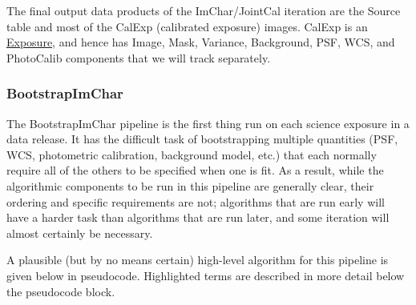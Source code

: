 The final output data products of the ImChar/JointCal iteration are the Source table and most of the CalExp (calibrated exposure) images.  CalExp is an \hyperref[sec:spImagesExposure]{Exposure}, and hence has Image, Mask, Variance, Background, PSF, WCS, and PhotoCalib components that we will track separately.

\subsubsection{BootstrapImChar}
\label{sec:drpBootstrapImChar}

The BootstrapImChar pipeline is the first thing run on each science exposure in a data release.  It has the difficult task of bootstrapping multiple quantities (PSF, WCS, photometric calibration, background model, etc.) that each normally require all of the others to be specified when one is fit.  As a result, while the algorithmic components to be run in this pipeline are generally clear, their ordering and specific requirements are not; algorithms that are run early will have a harder task than algorithms that are run later, and some iteration will almost certainly be necessary.

A plausible (but by no means certain) high-level algorithm for this pipeline is given below in pseudocode.  Highlighted terms are described in more detail below the pseudocode block.


\newcommand{\hr}[1]{\hyperref[sec:drpBootstrapImChar_#1]{#1}}

